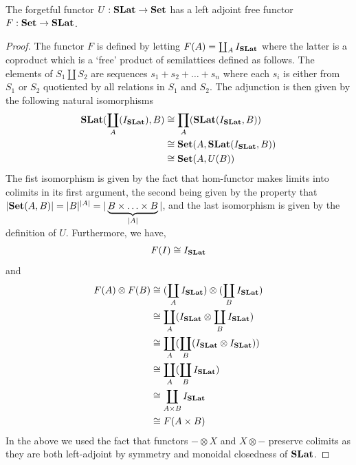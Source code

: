 \begin{proposition}
	The forgetful functor $U : \mathbf{SLat} \to \mathbf{Set}$ has a left adjoint free functor $F : \mathbf{Set} \to \mathbf{SLat}$.
\end{proposition}
\begin{proof}
	The functor $F$ is defined by letting $F(A) = \coprod_{A} I_{\mathbf{SLat}}$ where the latter is a coproduct which is a `free' product of semilattices defined as follows.
	The elements of $S_{1} \coprod S_{2}$ are sequences $s_{1} + s_{2} + \ldots + s_{n}$ where each $s_{i}$ is either from $S_{1}$ or $S_{2}$ quotiented by all relations in $S_{1}$ and $S_{2}$.
	The adjunction is then given by the following natural isomorphisms
	\begin{align*}
		\mathbf{SLat}(\coprod_{A}(I_{\mathbf{SLat}}), B) & \cong \prod_{A}(\mathbf{SLat}(I_{\mathbf{SLat}}, B))       \\
		                                                   & \cong \mathbf{Set}(A,\mathbf{SLat}(I_{\mathbf{SLat}}, B)) \\
		                                                   & \cong \mathbf{Set}(A, U(B))
	\end{align*}
	The fist isomorphism is given by the fact that hom-functor makes limits into colimits in its first argument, the second being given by the property that $|\mathbf{Set}(A,B)| = |B|^{|A|} = |\underbrace{B \times \ldots \times B}_{|A|}|$, and the last isomorphism is given by the definition of $U$.
	Furthermore, we have,
	\[
		F(I) \cong I_{\mathbf{SLat}}
	\]
	and
	\begin{align*}
		F(A) \otimes F(B) & \cong (\coprod_{A} I_{\mathbf{SLat}}) \otimes (\coprod_{B} I_{\mathbf{SLat}}) \\
		                  & \cong \coprod_{A} (I_{\mathbf{SLat}} \otimes \coprod_{B} I_{\mathbf{SLat}})   \\
		                  & \cong \coprod_{A} (\coprod_{B} (I_{\mathbf{SLat}} \otimes I_{\mathbf{SLat}})) \\
		                  & \cong \coprod_{A} (\coprod_{B} I_{\mathbf{SLat}})                              \\
		                  & \cong \coprod_{A \times B} I_{\mathbf{SLat}}                                   \\
		                  & \cong F(A \times B)
	\end{align*}
	In the above we used the fact that functors $- \otimes X$ and $X \otimes -$ preserve colimits as they are both left-adjoint by symmetry and monoidal closedness of $\mathbf{SLat}$.
\end{proof}

